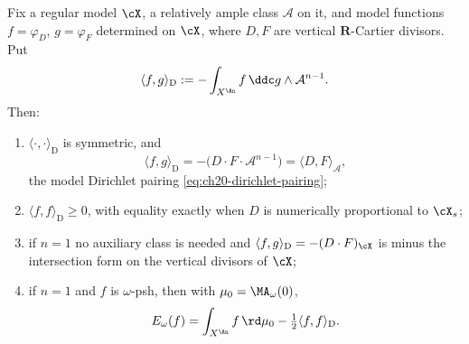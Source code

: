 \begin{proposition}
\label{prop:ch26-dirichlet-vertical}
Fix a regular model \(\cX\), a relatively ample class \(\mathcal A\) on it,
and model functions \(f=\varphi_D\), \(g=\varphi_F\) determined on \(\cX\),
where \(D,F\) are vertical \(\mathbf R\)-Cartier divisors.  Put
\begin{equation}
\label{eq:ch26-dirichlet-form}
 \langle f,g\rangle_{\mathrm D}
 :=-\int_{X^{\An}}f\,\ddc g\wedge\mathcal A^{n-1}.
\end{equation}
Then:
\begin{enumerate}
\item\label{itm:ch26-dir:sym}
 \(\langle\cdot,\cdot\rangle_{\mathrm D}\) is symmetric, and
 \[
  \langle f,g\rangle_{\mathrm D}
  =-\bigl(D\cdot F\cdot\mathcal A^{n-1}\bigr)
  =\langle D,F\rangle_{\mathcal A},
 \]
 the model Dirichlet pairing \eqref{eq:ch20-dirichlet-pairing};
\item\label{itm:ch26-dir:pos}
 \(\langle f,f\rangle_{\mathrm D}\geq0\), with equality exactly when \(D\)
 is numerically proportional to \(\cX_s\);
\item\label{itm:ch26-dir:curve}
 if \(n=1\) no auxiliary class is needed and
 \(\langle f,g\rangle_{\mathrm D}=-(D\cdot F)_{\cX}\) is minus the
 intersection form on the vertical divisors of \(\cX\);
\item\label{itm:ch26-dir:energy}
 if \(n=1\) and \(f\) is \(\omega\)-psh, then with
 \(\mu_0=\MA_\omega(0)\),
 \begin{equation}
 \label{eq:ch26-energy-dirichlet}
  E_\omega(f)=\int_{X^{\An}}f\,\rd\mu_0
              -\tfrac12\langle f,f\rangle_{\mathrm D}.
 \end{equation}
\end{enumerate}
\end{proposition}

